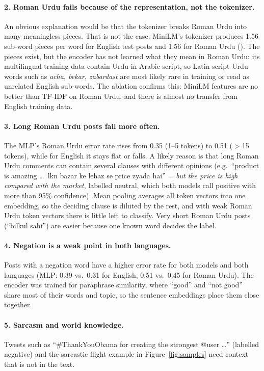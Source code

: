 \documentclass[11pt,a4paper]{article}
\begin{document}
\paragraph{2. Roman Urdu fails because of the representation, not the tokenizer.} An obvious
explanation would be that the tokenizer breaks Roman Urdu into many meaningless pieces. That
is not the case: MiniLM's tokenizer produces 1.56 sub-word pieces per word for English test
posts and 1.56 for Roman Urdu (). The pieces exist, but the
encoder has not learned what they mean in Roman Urdu: its multilingual training data contain
Urdu in Arabic script, so Latin-script Urdu words such as \emph{acha, bekar, zabardast} are most
likely rare in training or read as unrelated English sub-words. The ablation confirms this: MiniLM features are
no better than TF-IDF on Roman Urdu, and there is almost no transfer from English training data.

\paragraph{3. Long Roman Urdu posts fail more often.} The MLP's Roman Urdu error rate rises
from 0.35 (1--5 tokens) to 0.51 ($>$15 tokens), while for English it stays flat or falls. A likely
reason is that long Roman Urdu comments can contain several clauses with different opinions
(e.g.\ ``product is amazing \ldots\ lkn bazar ke lehaz se price zyada hai'' = \emph{but the
price is high compared with the market}, labelled neutral, which both models call positive with
more than 95\% confidence). Mean pooling averages all token vectors into one embedding, so the
deciding clause is diluted by the rest, and with weak Roman Urdu token vectors there is little
left to classify. Very short Roman Urdu posts (``bilkul sahi'') are easier
because one known word decides the label.

\paragraph{4. Negation is a weak point in both languages.} Posts with a negation word have a
higher error rate for both models and both languages (MLP: 0.39 vs.\ 0.31 for English, 0.51
vs.\ 0.45 for Roman Urdu). The encoder was trained for paraphrase similarity, where ``good'' and
``not good'' share most of their words and topic, so the sentence embeddings place them close
together.

\paragraph{5. Sarcasm and world knowledge.} Tweets such as ``\#ThankYouObama for creating the
strongest @user \ldots'' (labelled negative) and the sarcastic flight example in
Figure~\ref{fig:samples} need context that is not in the text.
\end{document}
